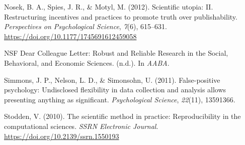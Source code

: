 \documentclass[
  a4paper,
]{article}
\newlength{\cslhangindent}
\newenvironment{CSLReferences}[2] %
 {\begin{list}{}{%
  \setlength{\itemindent}{0pt}
  \setlength{\leftmargin}{0pt}
  \setlength{\parsep}{0pt}
  \ifodd #1
   \setlength{\leftmargin}{\cslhangindent}
   \setlength{\itemindent}{-1\cslhangindent}
  \fi
  \setlength{\itemsep}{#2\baselineskip}}}
 {\end{list}}
\begin{document}
\begin{CSLReferences}{1}{0}
Nosek, B. A., Spies, J. R., \& Motyl, M. (2012). Scientific utopia: II.
Restructuring incentives and practices to promote truth over
publishability. \emph{Perspectives on Psychological Science},
\emph{7}(6), 615--631. \url{https://doi.org/10.1177/1745691612459058}

{NSF Dear Colleague Letter}: {Robust} and {Reliable Research} in the
{Social}, {Behavioral}, and {Economic Sciences}. (n.d.). In \emph{AABA}.

Simmons, J. P., Nelson, L. D., \& Simonsohn, U. (2011). False-positive
psychology: Undisclosed flexibility in data collection and analysis
allows presenting anything as significant. \emph{Psychological Science},
\emph{22}(11), 13591366.

Stodden, V. (2010). The scientific method in practice: Reproducibility
in the computational sciences. \emph{SSRN Electronic Journal}.
\url{https://doi.org/10.2139/ssrn.1550193}

\end{CSLReferences}
\end{document}
